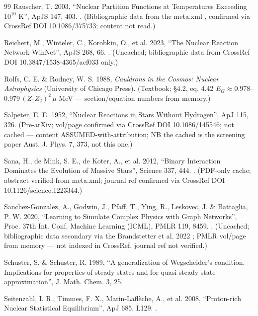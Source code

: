 \begin{thebibliography}{99}
Rauscher, T. 2003, ``Nuclear Partition Functions at Temperatures Exceeding $10^{10}$ K'', ApJS 147, 403. . (Bibliographic data from the meta.xml , confirmed via CrossRef DOI 10.1086/375733; content not read.)

Reichert, M., Winteler, C., Korobkin, O., et al. 2023, ``The Nuclear Reaction Network WinNet'', ApJS 268, 66. . (Uncached; bibliographic data from CrossRef DOI 10.3847/1538-4365/acf033 only.)

Rolfs, C. E. \& Rodney, W. S. 1988, \emph{Cauldrons in the Cosmos: Nuclear Astrophysics} (University of Chicago Press). (Textbook; \S 4.2, eq. 4.42 $E_G \approx 0.978$--$0.979\,(Z_1 Z_2)^2\,\mu$ MeV --- section/equation numbers from memory.)

Salpeter, E. E. 1952, ``Nuclear Reactions in Stars Without Hydrogen'', ApJ 115, 326. (Pre-arXiv; vol/page confirmed via CrossRef DOI 10.1086/145546; not cached --- content ASSUMED-with-attribution; NB the cached  is the screening paper Aust. J. Phys. 7, 373, not this one.)

Sana, H., de Mink, S. E., de Koter, A., et al. 2012, ``Binary Interaction Dominates the Evolution of Massive Stars'', Science 337, 444. . (PDF-only cache; abstract verified from meta.xml; journal ref confirmed via CrossRef DOI 10.1126/science.1223344.)

Sanchez-Gonzalez, A., Godwin, J., Pfaff, T., Ying, R., Leskovec, J. \& Battaglia, P. W. 2020, ``Learning to Simulate Complex Physics with Graph Networks'', Proc. 37th Int. Conf. Machine Learning (ICML), PMLR 119, 8459. . (Uncached; bibliographic data secondary via the Brandstetter et al. 2022 ; PMLR vol/page from memory --- not indexed in CrossRef, journal ref not verified.)

Schuster, S. \& Schuster, R. 1989, ``A generalization of Wegscheider's condition. Implications for properties of steady states and for quasi-steady-state approximation'', J. Math. Chem. 3, 25.

Seitenzahl, I. R., Timmes, F. X., Marin-Lafl\`eche, A., et al. 2008, ``Proton-rich Nuclear Statistical Equilibrium'', ApJ 685, L129. .


\end{thebibliography}
